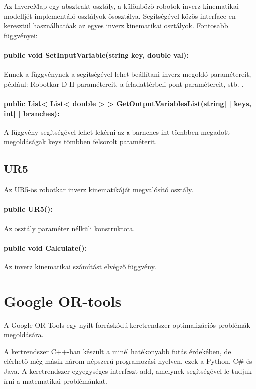 Az InvereMap egy absztrakt osztály, a különböző robotok inverz kinematikai modelljét implementáló osztályok ősosztálya. Segítségével közös interface-en keresztül használhatóak az egyes inverz kinematikai osztályok.
Fontosabb függvényei:
\paragraph{public void SetInputVariable(string key, double val):}

Ennek a függvénynek a segítségével lehet beállítani inverz megoldó paramétereit, például: Robotkar D-H paramétereit, a feladattérbeli pont paramétereit, stb. .

\paragraph{public List< List< double > > GetOutputVariablesList(string[ ] keys, int[ ] branches):}

A függvény segítségével lehet lekérni az a barnches int tömbben megadott megoldáságak keys tömbben felsorolt paraméterit.
  
\subsection{UR5}

Az UR5-ös robotkar inverz kinematikáját megvalósító osztály.

\paragraph{public UR5():} 

Az osztály paraméter nélküli konstruktora.

\paragraph{public void Calculate():}

Az inverz kinematikai számítást elvégző függvény.
  
\section{Google OR-tools}

A Google OR-Tools egy nyílt forráskódú keretrendszer optimalizációs problémák megoldására.



A kertrendszer C++-ban készült a minél hatékonyabb futás érdekében, de elérhető még másik három népszerű programozási nyelven, ezek a Python, C\# és Java. A keretrendszer egyegységes interfészt add, amelynek segítségével le tudjuk írni a matematikai problémánkat. 

